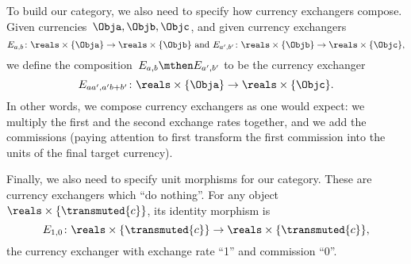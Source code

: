 
To build our category, we also need to specify how currency exchangers compose. Given currencies~$\Obja, \Objb, \Objc$, and given currency exchangers
\begin{equation*}
    E_{a,b} \colon \reals \times \{\Obja \} \to \reals \times \{ \Objb\}
    \text{ and }
    E_{a',b'} \colon \reals \times \{\Objb\} \to \reals \times \{\Objc\},
\end{equation*}
we define the composition~$E_{a,b} \mthen E_{a',b'}$ to be the currency exchanger
\begin{equation}
    \label{eq:comp-law-curr}
    E_{aa',a'b + b'} \colon \reals \times \{\Obja \} \to \reals \times \{\Objc\}.
\end{equation}
In other words, we compose currency exchangers as one would expect: we multiply the first and the second exchange rates together, and we add the commissions (paying attention to first transform the first commission into the units of the final target currency).

Finally, we also need to specify unit morphisms for our category. These are currency exchangers which ``do nothing''. For any object~$\reals \times \{ \transmuted{c}\}$, its identity morphism is
\begin{equation*}
    E_{1,0} \colon \reals \times \{\transmuted{c}\} \to \reals \times \{\transmuted{c}\},
\end{equation*}
the currency exchanger with exchange rate ``1'' and commission ``0''.


